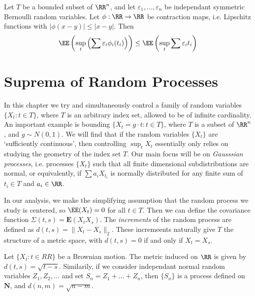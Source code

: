 \begin{theorem}
    Let $T$ be a bounded subset of $\RR^n$, and let $\varepsilon_1, \dots, \varepsilon_n$ be independant symmetric Bernoulli random variables. Let $\phi: \RR \to \RR$ be contraction maps, i.e. Lipschitz functions with $|\phi(x - y)| \leq |x - y|$. Then
    \[ \EE \left( \sup_t \left( \sum \varepsilon_i \phi_i(t_i) \right) \right) \leq \EE \left( \sup_t \sum \varepsilon_i t_i \right) \]
\end{theorem}







\chapter{Suprema of Random Processes}

In this chapter we try and simultaneously control a family of random variables $\{ X_t : t \in T \}$, where $T$ is an arbitrary index set, allowed to be of infinite cardinality. An important example is bounding $\{ X_t = g \cdot t : t \in T \}$, where $T$ is a subset of $\RR^n$, and $g \sim N(0,1)$. We will find that if the random variables $\{ X_t \}$ are `sufficiently continuous', then controlling $\sup_t X_t$ essentially only relies on studying the geometry of the index set $T$. Our main focus will be on {\it Gausssian processes}, i.e. processes $\{ X_t \}$ such that all finite dimensional subdistributions are normal, or equivalently, if $\sum a_i X_{t_i}$ is normally distributed for any finite sum of $t_i \in T$ and $a_i \in \RR$.

In our analysis, we make the simplifying assumption that the random process we study is centered, so $\EE(X_t) = 0$ for all $t \in T$. Then we can define the covariance function $\Sigma(t,s) = \mathbf{E}(X_t X_s)$. The {\it increments} of the random process are defined as $d(t,s) = \| X_t - X_s \|_2$.  These incremeents naturally give $T$ the structure of a metric space, with $d(t,s) = 0$ if and only if $X_t = X_s$.

\begin{example}
    Let $\{ X_t : t \in RR \}$ be a Brownian motion. The metric induced on $\RR$ is given by $d(t,s) = \sqrt{t-s}$. Similarily, if we consider independant normal random variables $Z_1, Z_2, \dots$ and set $S_n = Z_1 + \dots + Z_n$, then $\{ S_n \}$ is a process defined on $\mathbf{N}$, and $d(n,m) = \sqrt{n-m}$.
\end{example}

